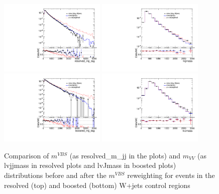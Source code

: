 \begin{figure}[!ht]
	\centering
	\includegraphics[width=0.45\textwidth]{Chapter5/resolved_mjj_tag_sub.pdf}	\includegraphics[width=0.45\textwidth]{Chapter5/lvjjmass_sub.pdf}
	\includegraphics[width=0.45\textwidth]{Chapter5/boosted_mjj_tag_sub.pdf}
	\includegraphics[width=0.45\textwidth]{Chapter5/lvJmass_sub.pdf}
	\caption{\label{Fig:mjjtag_rwt_Wjets}
		Comparison of $m^{VBS}$ (as resolved\_m\_jj in the plots) and $m_{VV}$ (as lvjjmass in resolved plots and lvJmass in boosted plots) distributions before and after the $m^{VBS}$ reweighting for events in the resolved (top) and boosted (bottom) W+jets control regions 
	}
\end{figure}

